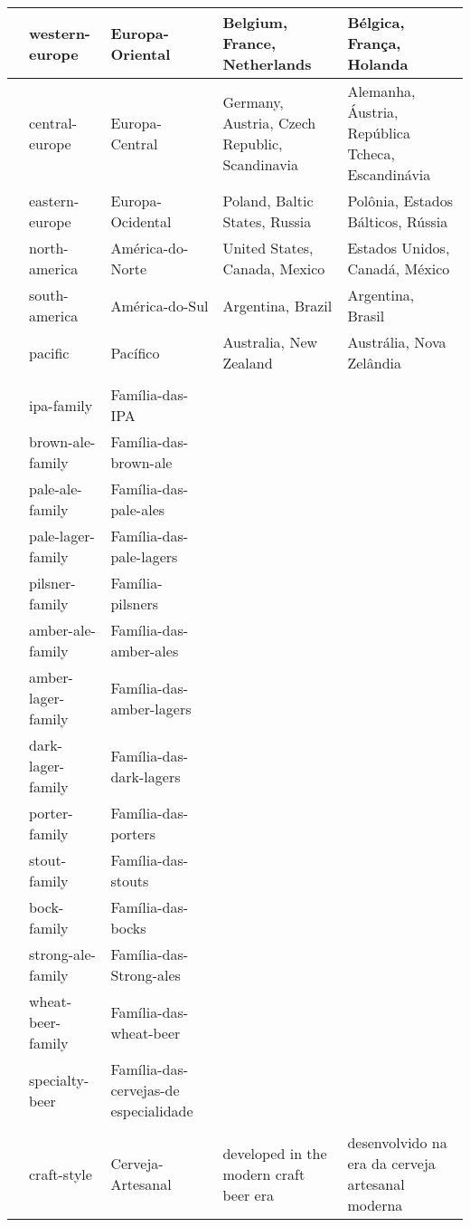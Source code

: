 \begin{longtable}{ | p{32mm} | p{32mm} | p{32mm} | p{32mm} | p{32mm} | }
\hline
& western-europe & Europa-Oriental & Belgium, France, Netherlands & Bélgica, França, Holanda \\
\hline
& central-europe & Europa-Central & Germany, Austria, Czech Republic, Scandinavia & Alemanha, Áustria, República Tcheca, Escandinávia \\
\hline
& eastern-europe & Europa-Ocidental & Poland, Baltic States, Russia & Polônia, Estados Bálticos, Rússia \\
\hline
& north-america & América-do-Norte & United States, Canada, Mexico & Estados Unidos, Canadá, México \\
\hline
& south-america & América-do-Sul & Argentina, Brazil & Argentina, Brasil \\
\hline
& pacific & Pacífico & Australia, New Zealand & Austrália, Nova Zelândia \\
\hline
\rowcolor{darkgray}
\multicolumn{5}{|l|}{\color{white}\textbf{Style Family (Família de Estilo)}} \\
\hline
& ipa-family & Família-das-IPA & & \\
\hline
& brown-ale-family & Família-das-brown-ale & & \\
\hline
& pale-ale-family & Família-das-pale-ales & & \\
\hline
& pale-lager-family & Família-das-pale-lagers & & \\
\hline
& pilsner-family & Família-pilsners & & \\
\hline
& amber-ale-family & Família-das-amber-ales & & \\
\hline
& amber-lager-family & Família-das-amber-lagers & & \\
\hline
& dark-lager-family & Família-das-dark-lagers & & \\
\hline
& porter-family & Família-das-porters & & \\
\hline
& stout-family & Família-das-stouts & & \\
\hline
& bock-family & Família-das-bocks & & \\
\hline
& strong-ale-family & Família-das-Strong-ales & & \\
\hline
& wheat-beer-family & Família-das-wheat-beer & & \\
\hline
& specialty-beer & Família-das-cervejas-de especialidade & & \\
\hline
\rowcolor{darkgray}
\multicolumn{5}{|l|}{\color{white}\textbf{Era (Era)}} \\
\hline
& craft-style & Cerveja-Artesanal & developed in the modern craft beer era & desenvolvido na era da cerveja artesanal moderna \\

\end{longtable}
